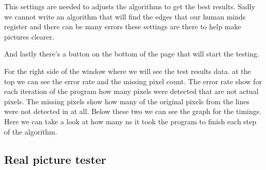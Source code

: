 This settings are needed to adjusts the algorithms to get the best results. Sadly we cannot write an algorithm that will find the edges that our human minds register and there can be many errors these settings are there to help make pictures clearer.

And lastly there's a button on the bottom of the page that will start the testing.

For the right side of the window where we will see the test results data. at the top we can see the error rate and the missing pixel count. The error rate show for each iteration of the program how many pixels were detected that are not actual pixels. The missing pixels show how many of the original pixels from the lines were not detected in at all. Below these two we can see the graph for the timings. Here we can take a look at how many ns it took the program to finish each step of the algorithm.

\subsection{Real picture tester}




